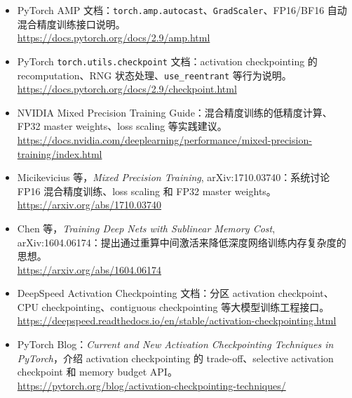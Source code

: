 \begingroup
\small
\sloppy
\begin{itemize}[leftmargin=1.5em]
  \item PyTorch AMP 文档：\texttt{torch.amp.autocast}、\texttt{GradScaler}、FP16/BF16 自动混合精度训练接口说明。\\
  \url{https://docs.pytorch.org/docs/2.9/amp.html}
  \item PyTorch \texttt{torch.utils.checkpoint} 文档：activation checkpointing 的 recomputation、RNG 状态处理、\texttt{use\_reentrant} 等行为说明。\\
  \url{https://docs.pytorch.org/docs/2.9/checkpoint.html}
  \item NVIDIA Mixed Precision Training Guide：混合精度训练的低精度计算、FP32 master weights、loss scaling 等实践建议。\\
  \url{https://docs.nvidia.com/deeplearning/performance/mixed-precision-training/index.html}
  \item Micikevicius 等，\emph{Mixed Precision Training}, arXiv:1710.03740：系统讨论 FP16 混合精度训练、loss scaling 和 FP32 master weights。\\
  \url{https://arxiv.org/abs/1710.03740}
  \item Chen 等，\emph{Training Deep Nets with Sublinear Memory Cost}, arXiv:1604.06174：提出通过重算中间激活来降低深度网络训练内存复杂度的思想。\\
  \url{https://arxiv.org/abs/1604.06174}
  \item DeepSpeed Activation Checkpointing 文档：分区 activation checkpoint、CPU checkpointing、contiguous checkpointing 等大模型训练工程接口。\\
  \url{https://deepspeed.readthedocs.io/en/stable/activation-checkpointing.html}
  \item PyTorch Blog：\emph{Current and New Activation Checkpointing Techniques in PyTorch}，介绍 activation checkpointing 的 trade-off、selective activation checkpoint 和 memory budget API。\\
  \url{https://pytorch.org/blog/activation-checkpointing-techniques/}
\end{itemize}
\endgroup
